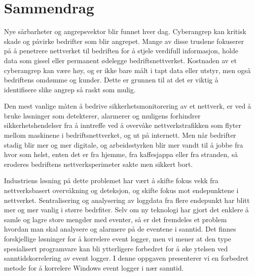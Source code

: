 \chapter*{Sammendrag}

Nye sårbarheter og angrepsvektor blir funnet hver dag. Cyberangrep kan kritisk skade og påvirke bedrifter som blir angrepet. Mange av disse truslene fokuserer på å penetrere nettverket til bedriften for å stjele verdifull informasjon, holde data som gissel eller permanent ødelegge bedriftsnettverket. Kostnaden av et cyberangrep kan være høy, og er ikke bare målt i tapt data eller utstyr, men også bedriftens omdømme og kunder. Dette er grunnen til at det er viktig å identifisere slike angrep så raskt som mulig.

Den mest vanlige måten å bedrive sikkerhetsmonitorering av et nettverk, er ved å bruke løsninger som detekterer, alarmerer og muligens forhindrer sikkerhetshendelser fra å inntreffe ved å overvåke nettverkstrafikken som flyter mellom maskinene i bedriftsnettverket, og ut på internett. Men når bedrifter stadig blir mer og mer digitale, og arbeidsstyrken blir mer vandt til å jobbe fra hvor som helst, enten det er fra hjemme, fra kaffesjappa eller fra stranden, så eroderes bedriftens nettverksperimeter sakte men sikkert bort.

Industriens løsning på dette problemet har vært å skifte fokus vekk fra nettverksbasert overvåkning og deteksjon, og skifte fokus mot endepunktene i nettverket. Sentralisering og analysering av loggdata fra flere endepunkt har blitt mer og mer vanlig i større bedrfiter. Selv om ny teknologi har gjort det enklere å samle og lagre store mengder med eventer, så er det fremdeles et problem hvordan man skal analysere og alarmere på de eventene i sanntid. Det finnes forskjellige løsninger for å korrelere event logger, men vi mener at den type spesialisert programvare kan bli ytterligere forbedret for å øke ytelsen ved sanntidskorrelering av event logger. I denne oppgaven presenterer vi en forbedret metode for å korrelere Windows event logger i nær sanntid.